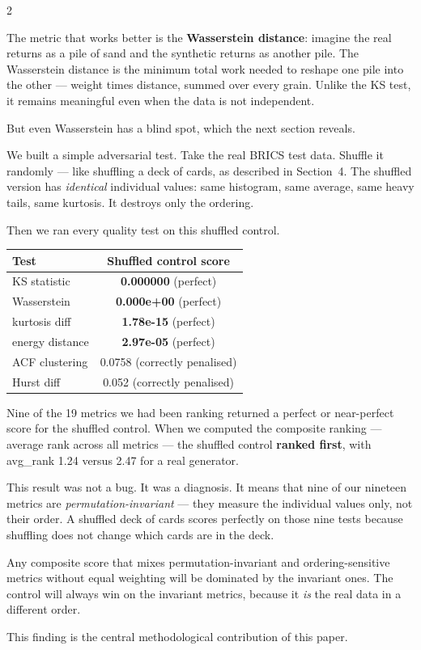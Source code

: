 \documentclass[10pt]{article}
\newcommand{\redbox}[2]{\begin{tcolorbox}[mybox={DRed}{RBg},title={#1}]#2\end{tcolorbox}}
\begin{document}
\begin{multicols}{2}
{The metric that works better is the \textbf{Wasserstein distance}: imagine the real returns as a pile of sand and the synthetic returns as another pile. The Wasserstein distance is the minimum total work needed to reshape one pile into the other --- weight times distance, summed over every grain. Unlike the KS test, it remains meaningful even when the data is not independent.

But even Wasserstein has a blind spot, which the next section reveals.}

\columnbreak

\redbox{7\quad The Shuffled Deck --- What We Discovered}{%
We built a simple adversarial test. Take the real BRICS test data. Shuffle it randomly --- like shuffling a deck of cards, as described in Section~4. The shuffled version has \emph{identical} individual values: same histogram, same average, same heavy tails, same kurtosis. It destroys only the ordering.

Then we ran every quality test on this shuffled control.

\medskip
\begin{tabular}{@{}lc@{}}
\toprule
Test & Shuffled control score \\
\midrule
KS statistic   & \textbf{0.000000} (perfect) \\
Wasserstein    & \textbf{0.000e+00} (perfect) \\
kurtosis diff  & \textbf{1.78e-15} (perfect) \\
energy distance & \textbf{2.97e-05} (perfect) \\
\midrule
ACF clustering & 0.0758 (correctly penalised) \\
Hurst diff     & 0.052 (correctly penalised) \\
\bottomrule
\end{tabular}

\medskip
Nine of the 19 metrics we had been ranking returned a perfect or near-perfect score for the shuffled control. When we computed the composite ranking --- average rank across all metrics --- the shuffled control \textbf{ranked first}, with avg\_rank 1.24 versus 2.47 for a real generator.

This result was not a bug. It was a diagnosis. It means that nine of our nineteen metrics are \emph{permutation-invariant} --- they measure the individual values only, not their order. A shuffled deck of cards scores perfectly on those nine tests because shuffling does not change which cards are in the deck.

Any composite score that mixes permutation-invariant and ordering-sensitive metrics without equal weighting will be dominated by the invariant ones. The control will always win on the invariant metrics, because it \emph{is} the real data in a different order.

\smallskip
This finding is the central methodological contribution of this paper.}

\end{multicols}
\end{document}
